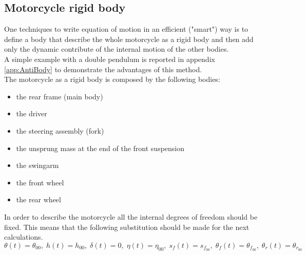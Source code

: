 \subsection{Motorcycle rigid body}
%
One techniques to write equation of motion in an efficient ("smart") way is to define a body that describe the whole motorcycle as a rigid body and then add only the dynamic contribute of the internal motion of the other bodies.\\
A simple example with a double pendulum is reported in appendix \ref{app:AntiBody} to demonstrate the advantages of this method.\\
The motorcycle as a rigid body is composed by the following bodies:
\begin{itemize}
    \setlength{\itemsep}{0pt}
    \item the rear frame (main body)
    \item the driver
    \item the steering  assembly (fork)
    \item the unsprung mass at the end of the front suspension
    \item the swingarm
    \item the front wheel
    \item the rear wheel
\end{itemize}
%
In order to describe the motorcycle all the internal degrees of freedom should be fixed. This means that the following substitution should be made for the next calculations.
%
\begin{equation*}
    \theta \left( t \right) =\theta_{00},\;h
    \left( t \right) =h_{00},\;\delta \left( t \right) =0,\;\eta \left( t
    \right) =\eta_{00},\;s_{f} \left( t \right) =s_{f_{00}},\;\theta_{f}
    \left( t \right) =\theta_{f_{00}},\;\theta_{r} \left( t \right) =\theta
   _{r_{00}}   
\end{equation*}
%
